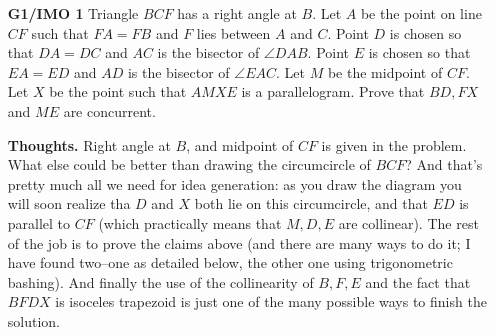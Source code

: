 \documentclass[11pt,a4paper]{article}
\begin{document}
\begin{itemize}
\item[\textbf{G1/IMO 1}]
Triangle $BCF$ has a right angle at $B$. Let $A$ be the point on line $CF$ such that $FA=FB$ and $F$ lies between $A$ and $C$. Point $D$ is chosen so that $DA=DC$ and $AC$ is the bisector of $\angle{DAB}$. Point $E$ is chosen so that $EA=ED$ and $AD$ is the bisector of $\angle{EAC}$. Let $M$ be the midpoint of $CF$. Let $X$ be the point such that $AMXE$ is a parallelogram. Prove that $BD,FX$ and $ME$ are concurrent.

\textbf{Thoughts.} Right angle at $B$, and midpoint of $CF$ is given in the problem. What else could be better than drawing the circumcircle of $BCF$? And that's pretty much all we need for idea generation: as you draw the diagram you will soon realize tha $D$ and $X$ both lie on this circumcircle, and that $ED$ is parallel to $CF$ (which practically means that $M, D, E$ are collinear). The rest of the job is to prove the claims above (and there are many ways to do it; I have found two--one as detailed below, the other one using trigonometric bashing). And finally the use of the collinearity of $B, F, E$ and the fact that $BFDX$ is isoceles trapezoid is just one of the many possible ways to finish the solution. 


\end{itemize}
\end{document}
